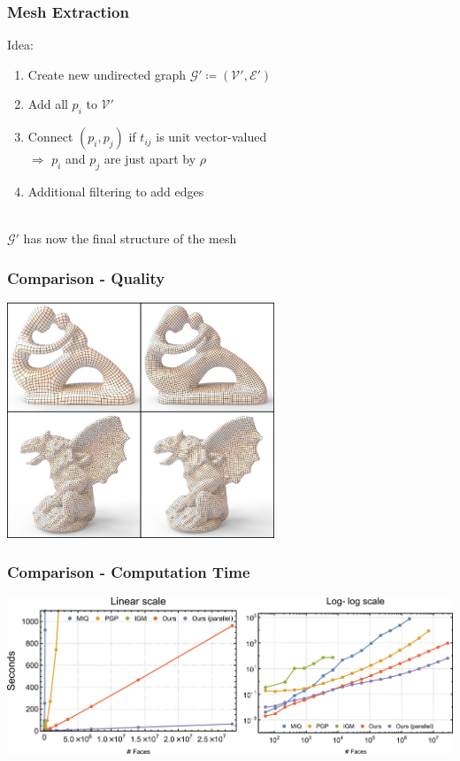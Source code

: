 \documentclass[aspectratio=43,sanserif,professionalfonts]{beamer}
\begin{document}
\begin{frame}
	\frametitle{Mesh Extraction}
	Idea:
	\begin{enumerate}
		\item	Create new undirected graph $\mathcal{G}' \coloneqq (\mathcal{V}', \mathcal{E}')$
		\item	Add all $p_i$ to $\mathcal{V'}$
		\pause
		\item	Connect $(p_i, p_j)$ if $t_{ij}$ is unit vector-valued\\
				$\Rightarrow$ $p_i$ and $p_j$ are just apart by $\rho$
		\pause
		\item	Additional filtering to add edges
	\end{enumerate}
	\pause
	~\\
	$\mathcal{G}'$ has now the final structure of the mesh
\end{frame}

\begin{frame}
	\frametitle{Comparison - Quality}
	\centering
	\includegraphics[width=0.6\textwidth]{img/quality.png}
\end{frame}

\begin{frame}
	\frametitle{Comparison - Computation Time}
	\centering
	\includegraphics[width=\textwidth]{img/computation-time.png}
\end{frame}
\end{document}
